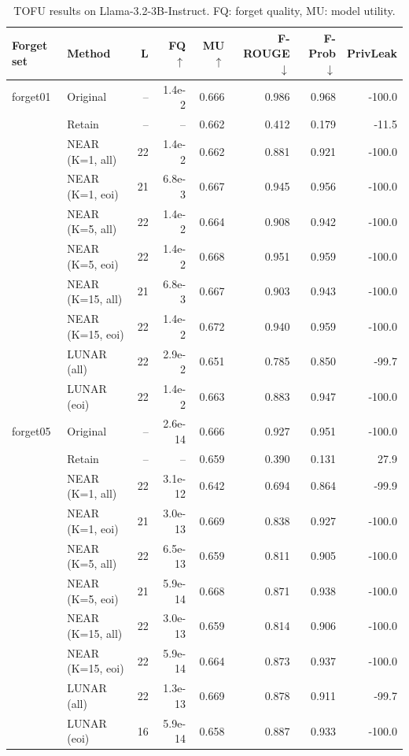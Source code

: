 \begin{table}[t]
\centering\small
\caption{TOFU results on Llama-3.2-3B-Instruct. FQ: forget quality, MU: model utility.}
\begin{tabular}{llrrrrrr}
\toprule
Forget set & Method & L & FQ$\uparrow$ & MU$\uparrow$ & F-ROUGE$\downarrow$ & F-Prob$\downarrow$ & PrivLeak \\
\midrule
forget01 & Original & -- & 1.4e-2 & 0.666 & 0.986 & 0.968 & -100.0 \\
 & Retain & -- & -- & 0.662 & 0.412 & 0.179 & -11.5 \\
 & NEAR (K=1, all) & 22 & 1.4e-2 & 0.662 & 0.881 & 0.921 & -100.0 \\
 & NEAR (K=1, eoi) & 21 & 6.8e-3 & 0.667 & 0.945 & 0.956 & -100.0 \\
 & NEAR (K=5, all) & 22 & 1.4e-2 & 0.664 & 0.908 & 0.942 & -100.0 \\
 & NEAR (K=5, eoi) & 22 & 1.4e-2 & 0.668 & 0.951 & 0.959 & -100.0 \\
 & NEAR (K=15, all) & 21 & 6.8e-3 & 0.667 & 0.903 & 0.943 & -100.0 \\
 & NEAR (K=15, eoi) & 22 & 1.4e-2 & 0.672 & 0.940 & 0.959 & -100.0 \\
 & LUNAR (all) & 22 & 2.9e-2 & 0.651 & 0.785 & 0.850 & -99.7 \\
 & LUNAR (eoi) & 22 & 1.4e-2 & 0.663 & 0.883 & 0.947 & -100.0 \\
\midrule
forget05 & Original & -- & 2.6e-14 & 0.666 & 0.927 & 0.951 & -100.0 \\
 & Retain & -- & -- & 0.659 & 0.390 & 0.131 & 27.9 \\
 & NEAR (K=1, all) & 22 & 3.1e-12 & 0.642 & 0.694 & 0.864 & -99.9 \\
 & NEAR (K=1, eoi) & 21 & 3.0e-13 & 0.669 & 0.838 & 0.927 & -100.0 \\
 & NEAR (K=5, all) & 22 & 6.5e-13 & 0.659 & 0.811 & 0.905 & -100.0 \\
 & NEAR (K=5, eoi) & 21 & 5.9e-14 & 0.668 & 0.871 & 0.938 & -100.0 \\
 & NEAR (K=15, all) & 22 & 3.0e-13 & 0.659 & 0.814 & 0.906 & -100.0 \\
 & NEAR (K=15, eoi) & 22 & 5.9e-14 & 0.664 & 0.873 & 0.937 & -100.0 \\
 & LUNAR (all) & 22 & 1.3e-13 & 0.669 & 0.878 & 0.911 & -99.7 \\
 & LUNAR (eoi) & 16 & 5.9e-14 & 0.658 & 0.887 & 0.933 & -100.0 \\
\midrule

\end{tabular}
\end{table}
